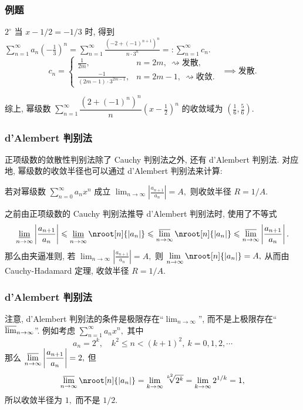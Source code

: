 \begin{frame}
\frametitle{例题}

$2^{\circ}$ 当 $x - 1/2 = -1/3$ 时, 得到 $\displaystyle \sum_{n=1}^{\infty} a_n \left( -\frac{1}{3} \right)^n = \sum_{n=1}^{\infty} \frac{(-2 + (-1)^{n+1})^n}{n \cdot 3^n} =: \sum_{n=1}^{\infty} c_n.$
\[
c_n = \begin{cases}
\frac{1}{2m}, & n = 2m, ~ \rightsquigarrow \text{发散}, \\ \frac{-1}{(2m - 1) \cdot 3^{2m - 1}}, & n = 2m - 1, ~ \rightsquigarrow \text{收敛}.
\end{cases}
~~ \implies \text{发散}.
\]

\pause

综上, 幂级数 $\displaystyle \sum_{n=1}^{\infty} \dfrac{(2 + (-1)^n)^n}{n} \left( x - \frac{1}{2} \right)^n$ 的收敛域为 $\left( \frac{1}{6}, \frac{5}{6} \right).$

\end{frame}


\begin{frame}
\frametitle{d'Alembert 判别法}

正项级数的敛散性判别法除了 Cauchy 判别法之外, 还有 d'Alembert 判别法. 对应地, 幂级数的收敛半径也可以通过 d'Alembert 判别法来计算:

\begin{thm}
若对幂级数 $\displaystyle \sum_{n=0}^{\infty} a_n x^n$ 成立 $\displaystyle \lim_{n\to\infty} \left| \frac{a_{n+1}}{a_n} \right| = A,$ 则收敛半径 $R = 1/A.$
\end{thm}

\pause

\startproof[bg=yellow, fg=red]
之前由正项级数的 Cauchy 判别法推导 d'Alembert 判别法时, 使用了不等式
\[
\varliminf_{n\to\infty} \left| \frac{a_{n+1}}{a_n} \right| \leqslant \varliminf_{n\to\infty} \nroot[n]{|a_n|} \leqslant \varlimsup_{n\to\infty} \nroot[n]{|a_n|} \leqslant \varlimsup_{n\to\infty} \left| \frac{a_{n+1}}{a_n} \right|.
\]
那么由夹逼准则, 若 $\displaystyle \lim_{n\to\infty} \left| \frac{a_{n+1}}{a_n} \right| = A,$ 则 $\displaystyle \lim_{n\to\infty} \nroot[n]{|a_n|} = A,$ 从而由 Cauchy-Hadamard 定理, 收敛半径 $R = 1/A.$

\end{frame}


\begin{frame}
\frametitle{d'Alembert 判别法}

\begin{remark}
注意, d'Alembert 判别法的条件是极限存在``$\lim_{n\to\infty}$'', 而不是上极限存在``$\varlimsup_{n\to\infty}$''. 例如考虑 $\displaystyle \sum_{n=1}^{\infty} a_n x^n,$ 其中
\[
a_n = 2^k, \quad k^2 \leqslant n < (k+1)^2, ~ k = 0, 1, 2, \cdots
\]
那么 $\displaystyle \varlimsup_{n\to\infty} \left| \frac{a_{n+1}}{a_n} \right| = 2,$ 但
\[
\varlimsup_{n\to\infty} \nroot[n]{|a_n|} = \lim_{k\to\infty} \sqrt[k^2]{2^k} = \lim_{k\to\infty} 2^{1/k} = 1,
\]
所以收敛半径为 $1,$ 而不是 $1/2.$
\end{remark}

\end{frame}

